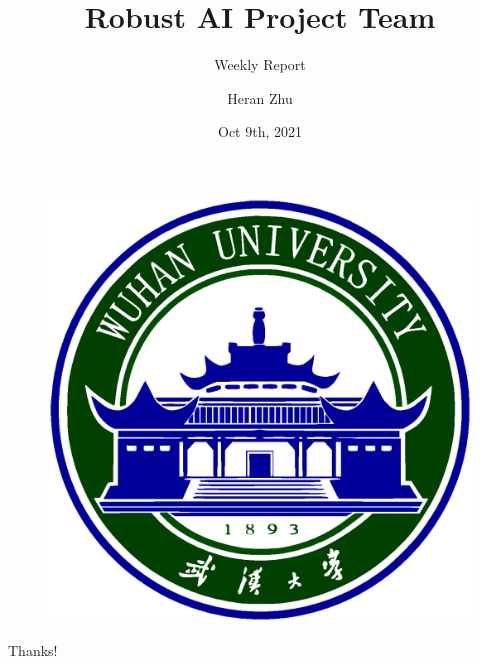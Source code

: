 \documentclass[aspectratio=169]{beamer}
\author{Heran Zhu}
\title{Robust AI Project Team}
\subtitle{Weekly Report}
\institute{Electronic Information School, Wuhan University}
\date{Oct 9th, 2021}
\begin{document}
\kaishu
\begin{frame}
	\titlepage
	\begin{figure}[htb]
		\begin{center}
			\includegraphics[width=0.1\linewidth]{pic/whulogo.eps}
		\end{center}
	\end{figure}
\end{frame}




% 
% 
% 
% 
% 
% 
% 
% 


% 
% 
% 




% 	
% 	

\begin{frame}
    \begin{center}
        {\Huge Thanks!}
    \end{center}
\end{frame}
\end{document}
